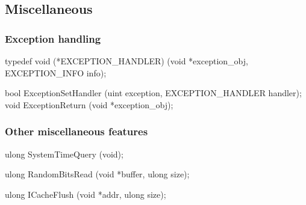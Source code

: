 \subsection{Miscellaneous}
\label{sec:abi:misc}







\subsubsection*{Exception handling}



\begin{paldef}
typedef void (*EXCEPTION_HANDLER)
            (void *exception_obj, EXCEPTION_INFO info);
\end{paldef}



\begin{paldef}
bool ExceptionSetHandler  (uint exception,
                           EXCEPTION_HANDLER handler);
void ExceptionReturn      (void *exception_obj);
\end{paldef}




\subsubsection*{Other miscellaneous features}



\begin{paldef}
ulong SystemTimeQuery (void);
\end{paldef}


\begin{paldef}
ulong RandomBitsRead (void *buffer, ulong size);
\end{paldef}


\begin{paldef}
ulong ICacheFlush (void *addr, ulong size);
\end{paldef}
